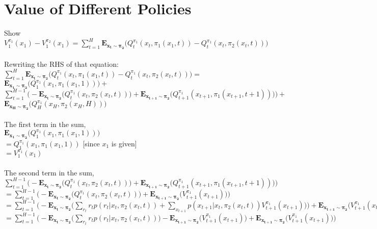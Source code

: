 \documentclass[10pt,a4paper]{article}
\begin{document}
  \section{Value of Different Policies}
  Show $V_1^{\pi_1}(x_1) - V_1^{\pi_2}(x_1) = \sum\limits_{t=1}^{H}\mathbf{E_{x_t\sim\pi_2}}\big(Q_t^{\pi_1}(x_t, \pi_1(x_1, t)) - Q_t^{\pi_1}(x_t, \pi_2(x_t, t))\big)$ \\ \\
  Rewriting the RHS of that equation: \\
  $\sum\limits_{t=1}^{H}\mathbf{E_{x_t\sim\pi_2}}\big(Q_t^{\pi_1}(x_t, \pi_1(x_1, t)) - Q_t^{\pi_1}(x_t, \pi_2(x_t, t))\big) =$ \\
  $\mathbf{E_{x_1\sim\pi_2}}\big(Q_1^{\pi_1}(x_1, \pi_1(x_1,1))\big) +$ \\
  $\sum\limits_{t=1}^{H-1}\Big(-\mathbf{E_{x_t\sim\pi_2}}\big( Q_t^{\pi_1}(x_t, \pi_2(x_t, t))\big) + \mathbf{E_{x_{t+1}\sim\pi_2}}\big(Q_{t+1}^{\pi_1}(x_{t+1}, \pi_1(x_{t+1}, t+1))\big)\Big)+$
  $\mathbf{E_{x_H\sim\pi_2}}\big(Q_H^{\pi_1}(x_H,\pi_2(x_H,H))\big)$ \\ \\
  The first term in the sum, \\
  $\mathbf{E_{x_1\sim\pi_2}}\big(Q_1^{\pi_1}(x_1, \pi_1(x_1,1))\big)$ \\
  $= Q_1^{\pi_1}(x_1, \pi_1(x_1,1))$ [since $x_1$ is given] \\
  $= V_1^{\pi_1}(x_1)$ \\ \\
  The second term in the sum, \\
  $\sum\limits_{t=1}^{H-1}\Big(-\mathbf{E_{x_t\sim\pi_2}}\big( Q_t^{\pi_1}(x_t, \pi_2(x_t, t))\big) + \mathbf{E_{x_{t+1}\sim\pi_2}}\big(Q_{t+1}^{\pi_1}(x_{t+1}, \pi_1(x_{t+1}, t+1))\big)\Big)$ \\
  $=\sum\limits_{t=1}^{H-1}\Big(-\mathbf{E_{x_t\sim\pi_2}}\big( Q_t^{\pi_1}(x_t, \pi_2(x_t, t))\big) + \mathbf{E_{x_{t+1}\sim\pi_2}}\big(V_{t+1}^{\pi_1}(x_{t+1})\big)\Big)$ \\
  $=\sum\limits_{t=1}^{H-1}\Big(-\mathbf{E_{x_t\sim\pi_2}}\big(\sum\limits_{r_t} r_t p(r_t|x_t,\pi_2(x_t,t))+\sum\limits_{x_{t+1}}p(x_{t+1}|x_t,\pi_2(x_t,t))V_{t+1}^{\pi_1}(x_{t+1}))\big) + \mathbf{E_{x_{t+1}\sim\pi_2}}\big(V_{t+1}^{\pi_1}(x_{t+1})\big)\Big)$ \\  
  $=\sum\limits_{t=1}^{H-1}\Big(-\mathbf{E_{x_t\sim\pi_2}}\big(\sum\limits_{r_t} r_t p(r_t|x_t,\pi_2(x_t,t))\big)-\mathbf{E_{x_{t+1}\sim\pi_2}}\big(V_{t+1}^{\pi_1}(x_{t+1})\big) + \mathbf{E_{x_{t+1}\sim\pi_2}}\big(V_{t+1}^{\pi_1}(x_{t+1})\big)\Big)$ \\  
\end{document}

